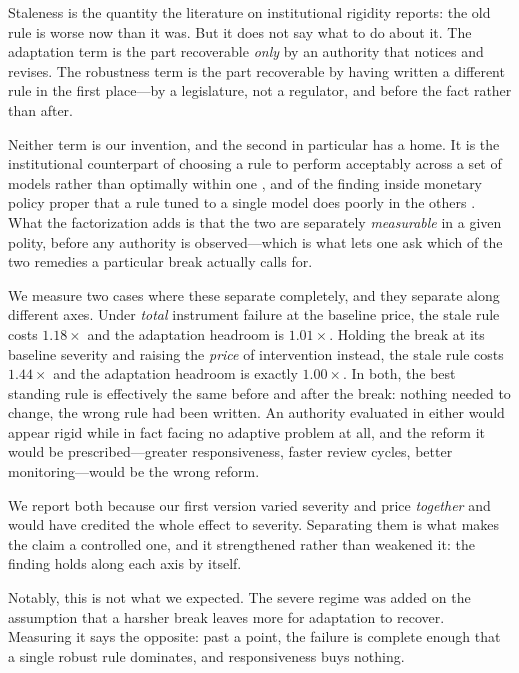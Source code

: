 \documentclass[11pt]{article}
\begin{document}
Staleness is the quantity the literature on institutional rigidity reports: the old rule is worse
now than it was. But it does not say what to do about it. The adaptation term is the part recoverable
\emph{only} by an authority that notices and revises. The robustness term is the part recoverable by
having written a different rule in the first place---by a legislature, not a regulator, and before
the fact rather than after.

Neither term is our invention, and the second in particular has a home. It is the institutional
counterpart of choosing a rule to perform acceptably across a set of models rather than optimally
within one \citep{hansen2008robustness}, and of the finding inside monetary policy proper that a rule
tuned to a single model does poorly in the others \citep{levin1999robustness}. What the factorization
adds is that the two are separately \emph{measurable} in a given polity, before any authority is
observed---which is what lets one ask which of the two remedies a particular break actually calls
for.

We measure two cases where these separate completely, and they separate along different axes. Under
\emph{total} instrument failure at the baseline price, the stale rule costs $1.18\times$ and the
adaptation headroom is $1.01\times$. Holding the break at its baseline severity and raising the
\emph{price} of intervention instead, the stale rule costs $1.44\times$ and the adaptation headroom
is exactly $1.00\times$. In both, the best standing rule is effectively the same before and after
the break: nothing needed to change, the wrong rule had been written. An authority evaluated in
either would appear rigid while in fact facing no adaptive problem at all, and the reform it would
be prescribed---greater responsiveness, faster review cycles, better monitoring---would be the wrong
reform.

We report both because our first version varied severity and price \emph{together} and would have
credited the whole effect to severity. Separating them is what makes the claim a controlled one, and
it strengthened rather than weakened it: the finding holds along each axis by itself.

Notably, this is not what we expected. The severe regime was added on the assumption that a harsher
break leaves more for adaptation to recover. Measuring it says the opposite: past a point, the
failure is complete enough that a single robust rule dominates, and responsiveness buys nothing.
\end{document}
